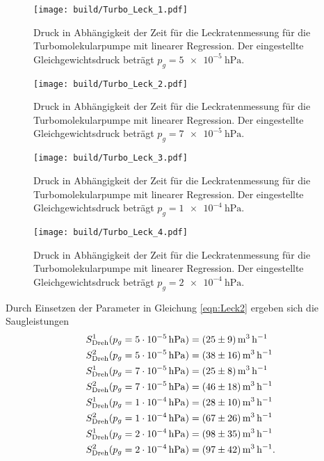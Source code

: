 \begin{figure}[H]
    \centering
    \texttt{[image: build/Turbo\_Leck\_1.pdf]}
    \caption{Druck in Abhängigkeit der Zeit für die Leckratenmessung für die Turbomolekularpumpe mit linearer Regression. Der eingestellte Gleichgewichtsdruck beträgt $p_g=\SI{5e-5}{\hecto\pascal}$.}
    \label{fig:turbo_leck1}
\end{figure}
\noindent
\begin{figure}[H]
    \centering
    \texttt{[image: build/Turbo\_Leck\_2.pdf]}
    \caption{Druck in Abhängigkeit der Zeit für die Leckratenmessung für die Turbomolekularpumpe mit linearer Regression. Der eingestellte Gleichgewichtsdruck beträgt $p_g=\SI{7e-5}{\hecto\pascal}$.}
    \label{fig:turbo_leck2}
\end{figure}
\noindent
\begin{figure}[H]
    \centering
    \texttt{[image: build/Turbo\_Leck\_3.pdf]}
    \caption{Druck in Abhängigkeit der Zeit für die Leckratenmessung für die Turbomolekularpumpe mit linearer Regression. Der eingestellte Gleichgewichtsdruck beträgt $p_g=\SI{1e-4}{\hecto\pascal}$.}
    \label{fig:turbo_leck3}
\end{figure}
\noindent
\begin{figure}[H]
    \centering
    \texttt{[image: build/Turbo\_Leck\_4.pdf]}
    \caption{Druck in Abhängigkeit der Zeit für die Leckratenmessung für die Turbomolekularpumpe mit linearer Regression. Der eingestellte Gleichgewichtsdruck beträgt $p_g=\SI{2e-4}{\hecto\pascal}$.}
    \label{fig:turbo_leck4}
\end{figure}
\noindent
Durch Einsetzen der Parameter in Gleichung \ref{eqn:Leck2} ergeben sich die Saugleistungen 
\begin{align*}
  S^1_\text{Dreh}(p_g=\SI{5e-5}{\hecto\pascal})&=\SI[per-mode=reciprocal]{25 \pm 9}{\cubic\metre\per\hour}\\
  S^2_\text{Dreh}(p_g=\SI{5e-5}{\hecto\pascal})&=\SI[per-mode=reciprocal]{38 \pm 16}{\cubic\metre\per\hour}\\
  S^1_\text{Dreh}(p_g=\SI{7e-5}{\hecto\pascal})&=\SI[per-mode=reciprocal]{25 \pm 8}{\cubic\metre\per\hour}\\
  S^2_\text{Dreh}(p_g=\SI{7e-5}{\hecto\pascal})&=\SI[per-mode=reciprocal]{46 \pm 18}{\cubic\metre\per\hour}\\
  S^1_\text{Dreh}(p_g=\SI{1e-4}{\hecto\pascal})&=\SI[per-mode=reciprocal]{28 \pm 10}{\cubic\metre\per\hour}\\
  S^2_\text{Dreh}(p_g=\SI{1e-4}{\hecto\pascal})&=\SI[per-mode=reciprocal]{67 \pm 26}{\cubic\metre\per\hour}\\
  S^1_\text{Dreh}(p_g=\SI{2e-4}{\hecto\pascal})&=\SI[per-mode=reciprocal]{98 \pm 35}{\cubic\metre\per\hour}\\
  S^2_\text{Dreh}(p_g=\SI{2e-4}{\hecto\pascal})&=\SI[per-mode=reciprocal]{97 \pm 42}{\cubic\metre\per\hour}.
\end{align*}